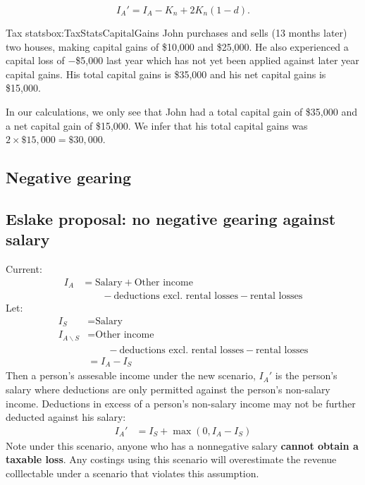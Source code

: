\documentclass{grattan}\usepackage[]{graphicx}\usepackage[]{color}
\newcommand{\EMPH}[1]{\textbf{#1}}
\begin{document}
\[I_A' = I_A - K_n + 2K_n(1 - d).\]

\begin{smallbox}{Tax stats}{box:TaxStatsCapitalGains}
John purchases and sells (13 months later) two houses, making capital gains of \$10,000 and \$25,000. He also experienced a capital loss of $-$\$5,000 last year which has not yet been applied against later year capital gains. His total capital gains is \$35,000 and his net capital gains is \$15,000.

In our calculations, we only see that John had a total capital gain of \$35,000 and a net capital gain of \$15,000. We infer that his total capital gains was $2\times \$15,000 = \$30,000$. 
\end{smallbox}






\subsection{Negative gearing}


\subsection{Eslake proposal: no negative gearing against salary}
Current:
\begin{align*}
I_A &= \text{Salary} + \text{Other income} \\
&\qquad{} - \text{deductions excl. rental losses} - \text{rental losses}
\end{align*}
Let:
\begin{align*}
I_S &= \text{Salary}\\
I_{A\backslash S} &= \text{Other income} \\
&\qquad{} - \text{deductions excl. rental losses} - \text{rental losses} \\
 &= I_A - I_S
\end{align*}
Then a person's assesable income under the new scenario, $I_A'$ is the person's salary where deductions are only permitted against the person's non-salary income. Deductions in excess of a person's non-salary income may not be further deducted against his salary:
\begin{align*}
I_A' &= I_S + \max\left(0, I_A - I_S \right)
\end{align*}
Note under this scenario, anyone who has a nonnegative salary \EMPH{cannot obtain a taxable loss}. Any costings using this scenario will overestimate the revenue colllectable under a scenario that violates this assumption.
\end{document}
